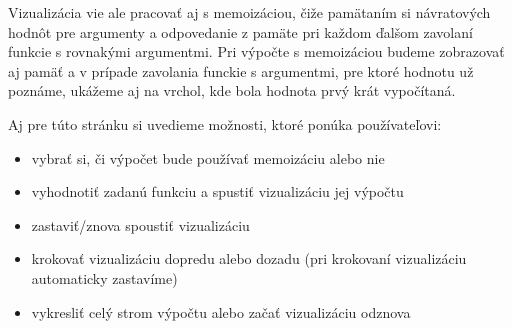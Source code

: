 Vizualizácia vie ale pracovať aj s memoizáciou, čiže pamätaním si návratových hodnôt pre
argumenty a odpovedanie z pamäte pri každom ďalšom zavolaní funkcie s rovnakými argumentmi.
Pri výpočte s memoizáciou budeme zobrazovať aj pamäť a v prípade zavolania funckie s argumentmi,
pre ktoré hodnotu už poznáme, ukážeme aj na vrchol, kde bola hodnota prvý krát vypočítaná.

Aj pre túto stránku si uvedieme možnosti, ktoré ponúka používateľovi:
\begin{itemize}
  \item vybrať si, či výpočet bude používať memoizáciu alebo nie
  \item vyhodnotiť zadanú funkciu a spustiť vizualizáciu jej výpočtu
  \item zastaviť/znova spoustiť vizualizáciu
  \item krokovať vizualizáciu dopredu alebo dozadu (pri krokovaní vizualizáciu
   automaticky zastavíme)
  \item vykresliť celý strom výpočtu alebo začať vizualizáciu odznova
\end{itemize}
